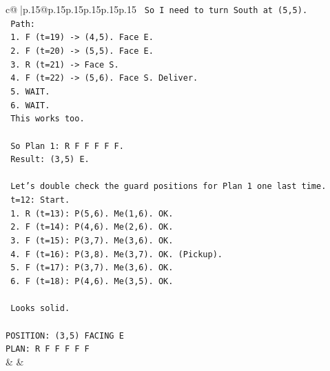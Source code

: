 \documentclass{article}
\begin{document}
{\begin{supertabular}{c@{$\;$}|p{.15\linewidth}@{}p{.15\linewidth}p{.15\linewidth}p{.15\linewidth}p{.15\linewidth}p{.15\linewidth}}
{{{\texttt{   So I need to turn South at (5,5).} \\
\texttt{   Path:} \\
\texttt{   1. F (t=19) {-}> (4,5). Face E.} \\
\texttt{   2. F (t=20) {-}> (5,5). Face E.} \\
\texttt{   3. R (t=21) {-}> Face S.} \\
\texttt{   4. F (t=22) {-}> (5,6). Face S. Deliver.} \\
\texttt{   5. WAIT.} \\
\texttt{   6. WAIT.} \\
\texttt{   This works too.} \\
\\ 
\texttt{   So Plan 1: R F F F F F.} \\
\texttt{   Result: (3,5) E.} \\
\\ 
\texttt{   Let's double check the guard positions for Plan 1 one last time.} \\
\texttt{   t=12: Start.} \\
\texttt{   1. R (t=13): P(5,6). Me(1,6). OK.} \\
\texttt{   2. F (t=14): P(4,6). Me(2,6). OK.} \\
\texttt{   3. F (t=15): P(3,7). Me(3,6). OK.} \\
\texttt{   4. F (t=16): P(3,8). Me(3,7). OK. (Pickup).} \\
\texttt{   5. F (t=17): P(3,7). Me(3,6). OK.} \\
\texttt{   6. F (t=18): P(4,6). Me(3,5). OK.} \\
\\ 
\texttt{   Looks solid.} \\
\\ 
\texttt{POSITION: (3,5) FACING E} \\
\texttt{PLAN: R F F F F F} \\
            }
        }
    }
    & & \\ \\


\end{supertabular}}
\end{document}
